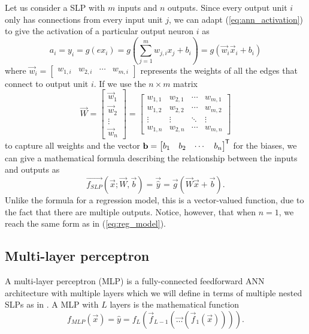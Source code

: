 Let us consider a SLP with $m$ inputs and $n$ outputs. 
Since every output unit $i$ only has connections from every input unit $j$,
we can adapt (\ref{eq:ann_activation}) to give the activation of a particular output neuron $i$ as
\begin{equation}
    a_i = y_i = g\left({ex}_i\right) = g\left(\sum_{j=1}^m{w_{j,i} x_j} + b_i\right)
    = g\left( \vec{w}_i \vec{x}_i + b_i\right)
\end{equation}
where
$
    \vec{w}_i = \begin{bmatrix}
        w_{1,i} & w_{2,i} & \cdots & w_{m,i}
    \end{bmatrix}
$
represents the weights of all the edges that connect to output unit $i$.
If we use the $n \times m$ matrix
\begin{equation}
    \vec{W} = \begin{bmatrix}
        \vec{w}_1 \\ \vec{w}_2 \\ \vdots \\ \vec{w}_n
    \end{bmatrix} = \begin{bmatrix}
        w_{1,1} & w_{2,1} & \cdots & w_{m,1} \\
        w_{1,2} & w_{2,2} & \cdots & w_{m,2} \\
        \vdots & \vdots & \ddots & \vdots \\
        w_{1,n} & w_{2,n} & \cdots & w_{m,n}
    \end{bmatrix}
\end{equation}
to capture all weights and the vector $\mathbf{b} = \begin{bmatrix}
    b_1 & b_2 & \cdots & b_n
\end{bmatrix}^{\mkern-1.5mu\mathsf{T}}$ for the biases, we can give a mathematical formula describing the relationship between the inputs and outputs as
\begin{equation}
    \label{eq:single_layer_perceptron}
    \vec{f_{SLP}}(\vec{x}; \vec{W}, \vec{b}) = \vec{\hat{y}} = \vec{g}\left( \vec{W} \vec{x} + \vec{b} \right).
\end{equation}
Unlike the formula for a regression model, this is a vector-valued function, due to the fact that there are multiple outputs. 
Notice, however, that when $n=1$, we reach the same form as in (\ref{eq:reg_model}). 

\subsection{Multi-layer perceptron}
A multi-layer perceptron (MLP) is a fully-connected feedforward ANN architecture with multiple layers which we will define in terms of multiple nested SLPs as in \cite{burkov2019}.
A MLP with $L$ layers is the mathematical function
\begin{equation}
    f_{MLP}(\vec{x})
        = \hat{y}
        = f_L \left(
            \vec{f}_{L-1} \left(
                \vec{\dots} \left(
                    \vec{f}_1 \left(
                        \vec{x}
                    \right)
                \right)
            \right)
        \right).
\end{equation}

